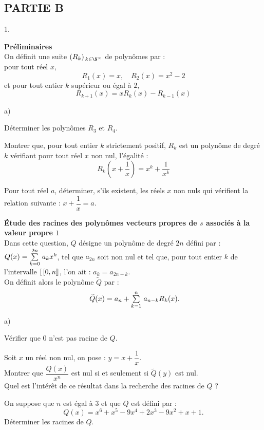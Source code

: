 \documentclass[11pt]{article}%
\begin{document}
\subsection*{PARTIE B}

\begin{noliste}{1.}
 \setlength{\itemsep}{4mm}
\item \textbf{Préliminaires}\\
On définit une suite $(R_{k})_{\,k\in \N^{\times }}$ de polynômes
par :\\
pour tout réel $x,$
\[
R_{1}(x) = x,\quad R_{2}(x) = x^{2}-2
\]
et pour tout entier $k$ supérieur ou égal à $2,$
\[
R_{k + 1}(x) = xR_{k}(x)-R_{k-1}(x)
\]

\begin{noliste}{a)}
 \setlength{\itemsep}{2mm}
\item Déterminer les polynômes $R_{3}$ et $R_{4}$.

\item Montrer que, pour tout entier $k$ strictement positif, $R_{k}$
est un
polynôme de degré $k$ vérifiant pour tout réel $x$ non nul, l'égalité :
\[
R_{k}\left( x + \dfrac{1}{x}\right) = x^{k} + \dfrac{1}{x^{k}}
\]

\item Pour tout réel $a$, déterminer, s'ils existent, les réels $x$ non
nuls
qui vérifient la relation suivante : $x + \dfrac{1}{x} = a$.
\end{noliste}

\item \textbf{Étude des racines des polynômes vecteurs propres de $s$
associés à la valeur propre $1$}\\
Dans cette question, $Q$ désigne un polynôme de degré $2n$ défini par :
$Q(x) = {\textstyle\sum\limits_{k = 0}^{2n}}\hspace{.1cm}a_{k}x^{k}$, tel que $a_{2n}$ soit non nul et
tel
que, pour tout entier $k$ de l'intervalle $[ \
\hspace{-0.15em}[0,n]\hspace{-0.13em}]$, l'on ait : $a_{k} = a_{2n-k}$.
\\
On définit alors le polynôme $\widetilde{Q}$ par : 
\[
\ \widetilde{Q}(x) = a_{n} + {\textstyle\sum\limits_{k = 1}^{n}}\hspace{.1cm}a_{n-k}R_{k}(x).
\]

\begin{noliste}{a)}
 \setlength{\itemsep}{2mm}
\item Vérifier que $0$ n'est pas racine de $Q$.

\item Soit $x$ un réel non nul, on pose : $y = x + \dfrac{1}{x}$. \\
Montrer que $\dfrac{Q(x)}{x^{n}}$ est nul si et seulement si
$\widetilde{Q}(y)$ est nul. \\
Quel est l'intérêt de ce résultat dans la recherche des racines de $Q$
?

\item On suppose que $n$ est égal à $3$ et que $Q$ est défini par :
\[
Q(x) = x^{6} + x^{5}-9x^{4} + 2x^{3}-9x^{2} + x + 1.
\]
Déterminer les racines de $Q$.
\end{noliste}
\end{noliste}
\end{document}
